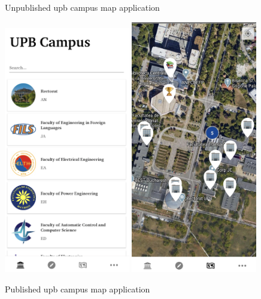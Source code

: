 \begin{figure}[!h]
\begin{minipage}[b]{0.49\textwidth}
            \caption{Unpublished \acrshort{upb} campus map application}
            \label{2:fig:upb_campus_unpublished}
        \end{minipage}
        \hfill
        \begin{minipage}[b]{0.49\textwidth}
            \captionsetup{justification=centering}
             \includegraphics[width=0.49\textwidth]{figures/upb_apps/navigation/upb_campus_published1.png}
             \includegraphics[width=0.49\textwidth]{figures/upb_apps/navigation/upb_campus_published2.png}
            \caption{Published \acrshort{upb} campus map application}
            \label{2:fig:upb_campus_published}
        \end{minipage}
    \end{figure}
    

